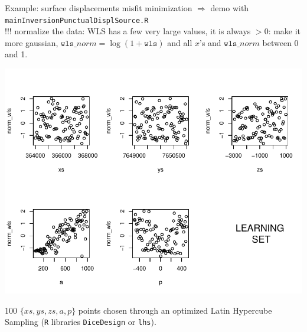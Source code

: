 \begin{frame}{}
\begin{exampleblock}{Example: surface displacements misfit minimization}
$\Rightarrow$ demo with \texttt{mainInversionPunctualDisplSource.R}\\
!!! normalize the data: WLS has a few very large values, it is always $>0$: make it more gaussian, 
$\mathtt{wls}\_norm = \log(1+\mathtt{wls})$ and all $x$'s and $\mathtt{wls}\_norm$ between 0 and 1.
\begin{minipage}[c]{0.6\textwidth}
\begin{center}
\includegraphics[width=\textwidth]{4_optimization/figures/misfit_learn_set} 
\end{center}
\end{minipage}
\begin{minipage}[c]{0.37\textwidth}
{\tiny 100 $\{xs,ys,zs,a,p\}$ points chosen through an optimized Latin Hypercube Sampling 
(\texttt{R} libraries \texttt{DiceDesign} or \texttt{lhs}).}\\
\end{minipage}
\end{exampleblock}
\end{frame}

